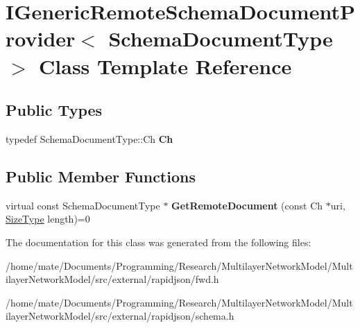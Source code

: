 \hypertarget{classIGenericRemoteSchemaDocumentProvider}{}\section{I\+Generic\+Remote\+Schema\+Document\+Provider$<$ Schema\+Document\+Type $>$ Class Template Reference}
\label{classIGenericRemoteSchemaDocumentProvider}
\subsection*{Public Types}
\begin{DoxyCompactItemize}
\item 
typedef Schema\+Document\+Type\+::\+Ch {\bfseries Ch}\hypertarget{classIGenericRemoteSchemaDocumentProvider_acfcd5492c3df8ff56cd2d84d36cc0ceb}{}\label{classIGenericRemoteSchemaDocumentProvider_acfcd5492c3df8ff56cd2d84d36cc0ceb}

\end{DoxyCompactItemize}
\subsection*{Public Member Functions}
\begin{DoxyCompactItemize}
\item 
virtual const Schema\+Document\+Type $\ast$ {\bfseries Get\+Remote\+Document} (const Ch $\ast$uri, \hyperlink{rapidjson_8h_a5ed6e6e67250fadbd041127e6386dcb5}{Size\+Type} length)=0\hypertarget{classIGenericRemoteSchemaDocumentProvider_aad112a069dd57fe850fafd04cbb4777b}{}\label{classIGenericRemoteSchemaDocumentProvider_aad112a069dd57fe850fafd04cbb4777b}

\end{DoxyCompactItemize}


The documentation for this class was generated from the following files\+:\begin{DoxyCompactItemize}
\item 
/home/mate/\+Documents/\+Programming/\+Research/\+Multilayer\+Network\+Model/\+Multilayer\+Network\+Model/src/external/rapidjson/fwd.\+h\item 
/home/mate/\+Documents/\+Programming/\+Research/\+Multilayer\+Network\+Model/\+Multilayer\+Network\+Model/src/external/rapidjson/schema.\+h\end{DoxyCompactItemize}
